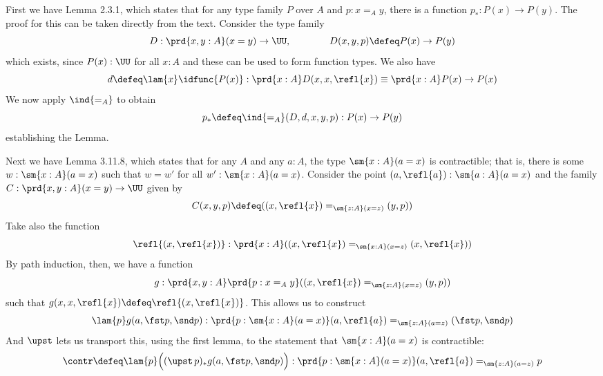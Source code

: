 First we have Lemma 2.3.1, which states that for any type family $P$ over $A$
and $p : x =_{A} y$, there is a function $p_{*} : P(x) \to P(y)$.  The proof
for this can be taken directly from the text.  Consider the type family
\[
D : \prd{x, y : A}(x = y) \to \UU,
\qquad\qquad
D(x, y, p) \defeq P(x) \to P(y)
\]
which exists, since $P(x) : \UU$ for all $x : A$ and these can be used to form
function types.  We also have
\[
d \defeq \lam{x}\idfunc{P(x)} 
: \prd{x:A}D(x, x, \refl{x})
\equiv \prd{x:A} P(x) \to P(x)
\]
We now apply $\ind{=_{A}}$ to obtain
\[
p_{*} \defeq \ind{=_{A}}(D, d, x, y, p) : P(x) \to P(y)
\]
establishing the Lemma.


Next we have Lemma 3.11.8, which states that for any $A$ and any $a : A$, the
type $\sm{x:A} (a = x)$ is contractible;  that is, there is some $w :
\sm{x:A}(a=x)$ such that $w = w'$ for all $w' : \sm{x:A}(a=x)$.  Consider the
point $(a, \refl{a}) : \sm{a:A}(a=x)$ and the family $C: \prd{x,y:A}(x=y) \to \UU$ given
by
\[
  C(x, y, p) \defeq 
  ((x, \refl{x}) =_{\sm{z:A}(x=z)} (y, p))
\]
Take also the function
\[
  \refl{(x, \refl{x})} : \prd{x:A} ((x, \refl{x}) =_{\sm{x:A}(x=z)} (x, \refl{x}))
\]
By path induction, then, we have a function
\[
  g : \prd{x, y:A}\prd{p:x =_{A} y} 
  ((x, \refl{x}) =_{\sm{z:A}(x=z)} (y, p))
\]
such that $g(x, x, \refl{x}) \defeq \refl{(x, \refl{x})}$.  
This allows us to construct
\[
  \lam{p}g(a, \fst p, \snd p) : 
  \prd{p:\sm{x:A}(a=x)}
  (a, \refl{a}) =_{\sm{z:A}(a=z)} (\fst p, \snd p)
\]
And $\upst$ lets us transport this, using the first lemma, to the statement
that $\sm{x:A}(a=x)$ is contractible:
\[
\contr \defeq \lam{p}\Big(
(\upst\,p)_{*}g(a, \fst p, \snd p)
\Big)
:
\prd{p:\sm{x:A}(a=x)}
(a, \refl{a}) =_{\sm{z:A}(a=z)} p
\]


